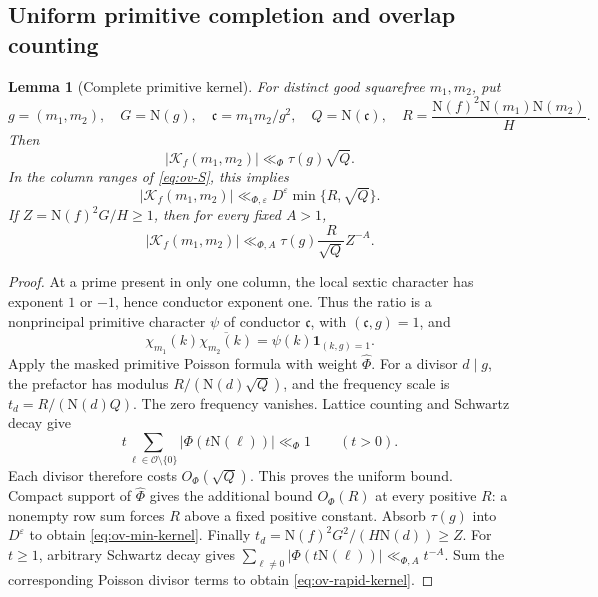 \documentclass[11pt]{article}
\numberwithin{equation}{section}
\newtheorem{lemma}[theorem]{Lemma}
\theoremstyle{definition}
\theoremstyle{remark}
\newcommand{\N}{\mathrm N}
\newcommand{\OO}{\mathcal O}
\newcommand{\ind}{\mathbf 1}
\newcommand{\eps}{\varepsilon}
\begin{document}
\subsection{Uniform primitive completion and overlap counting}

\begin{lemma}[Complete primitive kernel]\label{lem:ov-kernel}
For distinct good squarefree \(m_1,m_2\), put
\[
 g=(m_1,m_2),\quad G=\N(g),\quad
 \mathfrak c=m_1m_2/g^2,\quad Q=\N(\mathfrak c),\quad
 R=\frac{\N(f)^2\N(m_1)\N(m_2)}H.
\]
Then
\[
 |\mathcal K_f(m_1,m_2)|\ll_\Phi\tau(g)\sqrt Q.
\]
In the column ranges of \eqref{eq:ov-S}, this implies
\begin{equation}\label{eq:ov-min-kernel}
 |\mathcal K_f(m_1,m_2)|
 \ll_{\Phi,\eps}D^\eps\min\{R,\sqrt Q\}.
\end{equation}
If \(Z=\N(f)^2G/H\ge1\), then for every fixed \(A>1\),
\begin{equation}\label{eq:ov-rapid-kernel}
 |\mathcal K_f(m_1,m_2)|
 \ll_{\Phi,A}\tau(g)\frac R{\sqrt Q}Z^{-A}.
\end{equation}
\end{lemma}
\begin{proof}
At a prime present in only one column, the local sextic character
has exponent \(1\) or \(-1\), hence conductor exponent one.
Thus the ratio is a nonprincipal primitive character \(\psi\) of
conductor \(\mathfrak c\), with \((\mathfrak c,g)=1\), and
\[
 \chi_{m_1}(k)\overline{\chi_{m_2}(k)}
       =\psi(k)\ind_{(k,g)=1}.
\]
Apply the masked primitive Poisson formula
\cite[Lemma~4.2]{OA5} with weight \(\widehat\Phi\).
For a divisor \(d\mid g\), the prefactor has modulus
\(R/(\N(d)\sqrt Q)\), and the frequency scale is
\(t_d=R/(\N(d)Q)\). The zero frequency vanishes.
Lattice counting and Schwartz decay give
\[
 t\sum_{\ell\in\OO\setminus\{0\}}|\Phi(t\N(\ell))|
       \ll_\Phi1\qquad(t>0).
\]
Each divisor therefore costs \(O_\Phi(\sqrt Q)\).
This proves the uniform bound. Compact support of
\(\widehat\Phi\) gives the additional bound \(O_\Phi(R)\)
at every positive \(R\): a nonempty row sum forces \(R\)
above a fixed positive constant. Absorb \(\tau(g)\) into
\(D^\eps\) to obtain \eqref{eq:ov-min-kernel}.
Finally \(t_d=\N(f)^2G^2/(H\N(d))\ge Z\).
For \(t\ge1\), arbitrary Schwartz decay gives
\(\sum_{\ell\ne0}|\Phi(t\N(\ell))|\ll_{\Phi,A}t^{-A}\).
Sum the corresponding Poisson divisor terms to obtain
\eqref{eq:ov-rapid-kernel}.
\end{proof}
\end{document}
